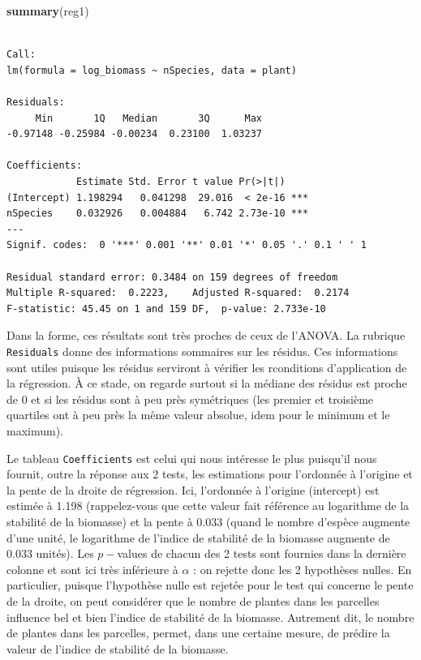 \documentclass[a4paperpaper,]{article}
\newenvironment{Shaded}{\begin{snugshade}}{\end{snugshade}}
\newcommand{\KeywordTok}[1]{\textcolor[rgb]{0.12,0.11,0.11}{\textbf{#1}}}
\newcommand{\NormalTok}[1]{\textcolor[rgb]{0.12,0.11,0.11}{#1}}
\begin{document}
\begin{Shaded}
\begin{Highlighting}[]
\KeywordTok{summary}\NormalTok{(reg1)}
\end{Highlighting}
\end{Shaded}

\begin{verbatim}

Call:
lm(formula = log_biomass ~ nSpecies, data = plant)

Residuals:
     Min       1Q   Median       3Q      Max 
-0.97148 -0.25984 -0.00234  0.23100  1.03237 

Coefficients:
            Estimate Std. Error t value Pr(>|t|)    
(Intercept) 1.198294   0.041298  29.016  < 2e-16 ***
nSpecies    0.032926   0.004884   6.742 2.73e-10 ***
---
Signif. codes:  0 '***' 0.001 '**' 0.01 '*' 0.05 '.' 0.1 ' ' 1

Residual standard error: 0.3484 on 159 degrees of freedom
Multiple R-squared:  0.2223,    Adjusted R-squared:  0.2174 
F-statistic: 45.45 on 1 and 159 DF,  p-value: 2.733e-10
\end{verbatim}

Dans la forme, ces résultats sont très proches de ceux de l'ANOVA. La rubrique \texttt{Residuals} donne des informations sommaires sur les résidus. Ces informations sont utiles puisque les résidus serviront à vérifier les rconditions d'application de la régression. À ce stade, on regarde surtout si la médiane des résidus est proche de 0 et si les résidus sont à peu près symétriques (les premier et troisième quartiles ont à peu près la même valeur absolue, idem pour le minimum et le maximum).

Le tableau \texttt{Coefficients} est celui qui nous intéresse le plus puisqu'il nous fournit, outre la réponse aux 2 tests, les estimations pour l'ordonnée à l'origine et la pente de la droite de régression. Ici, l'ordonnée à l'origine (intercept) est estimée à 1.198 (rappelez-vous que cette valeur fait référence au logarithme de la stabilité de la biomasse) et la pente à 0.033 (quand le nombre d'espèce augmente d'une unité, le logarithme de l'indice de stabilité de la biomasse augmente de 0.033 unités). Les \(p-\)values de chacun des 2 tests sont fournies dans la dernière colonne et sont ici très inférieure à \(\alpha\) : on rejette donc les 2 hypothèses nulles. En particulier, puisque l'hypothèse nulle est rejetée pour le test qui concerne le pente de la droite, on peut considérer que le nombre de plantes dans les parcelles influence bel et bien l'indice de stabilité de la biomasse. Autrement dit, le nombre de plantes dans les parcelles, permet, dans une certaine mesure, de prédire la valeur de l'indice de stabilité de la biomasse.
\end{document}
